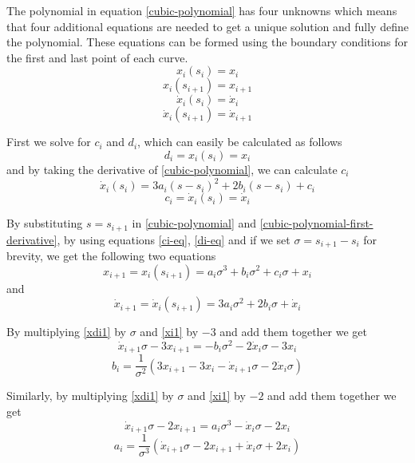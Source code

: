 The polynomial in equation \ref{cubic-polynomial} has four unknowns which means that four additional equations are needed to get a unique solution and fully 
define the polynomial. These equations can be formed using the boundary conditions for the first and last point of each curve.
\begin{equation}
x_i(s_i) = x_i
\end{equation}
\begin{equation}
x_i(s_{i+1}) = x_{i+1}
\end{equation}
\begin{equation}
\dot{x}_i(s_i) = \dot{x}_i
\end{equation}
\begin{equation}
\dot{x}_i(s_{i+1}) = \dot{x}_{i+1}
\end{equation}

First we solve for $c_i$ and $d_i$, which can easily be calculated as follows
\begin{equation}
\label{di-eq}
d_i = x_i(s_i) = x_i
\end{equation}
and by taking the derivative of \ref{cubic-polynomial}, we can calculate $c_i$
\begin{equation}
\label{cubic-polynomial-first-derivative}
\dot{x}_i(s_i) = 3a_i(s-s_i)^2 + 2b_i(s-s_i) + c_i
\end{equation}
\begin{equation}
\label{ci-eq}
c_i = \dot{x}_i(s_i) = \dot{x}_i
\end{equation}

By substituting $s = s_{i+1}$ in \ref{cubic-polynomial} and \ref{cubic-polynomial-first-derivative}, by using equations \ref{ci-eq}, \ref{di-eq} and if 
we set $σ = s_{i+1}-s_i$ for brevity, we get the following two equations
\begin{equation}
\label{xi1}
x_{i+1} = x_i(s_{i+1}) = a_i σ^3 + b_i σ^2 + c_i σ + x_i
\end{equation}
and
\begin{equation}
\label{xdi1}
\dot{x}_{i+1} = \dot{x}_i(s_{i+1}) = 3a_i σ^2 + 2b_i σ + \dot{x}_i
\end{equation}

By multiplying \ref{xdi1} by $σ$ and \ref{xi1} by $-3$ and add them together we get
\[
\dot{x}_{i+1}σ - 3x_{i+1} = -b_iσ^2 -2\dot{x}_iσ - 3x_i
\]
\begin{equation}
b_i = \frac{1}{σ^2} (3x_{i+1} -3x_i - \dot{x}_{i+1}σ - 2\dot{x}_iσ)
\end{equation}

Similarly, by multiplying \ref{xdi1} by $σ$ and \ref{xi1} by $-2$ and add them together we get
\[
\dot{x}_{i+1}σ - 2x_{i+1} = a_iσ^3 -\dot{x}_iσ - 2x_i
\]
\begin{equation}
a_i = \frac{1}{σ^3} (\dot{x}_{i+1}σ - 2x_{i+1} + \dot{x}_iσ +2x_i)
\end{equation}

